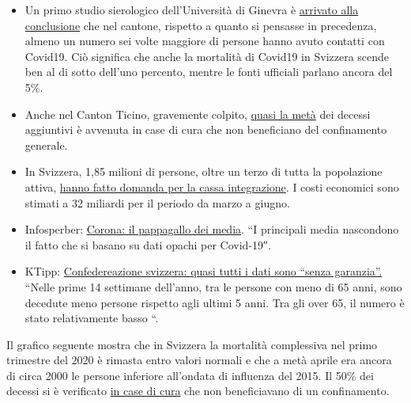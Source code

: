 \begin{itemize}
\tightlist
\item
  Un primo studio sierologico dell'Università di Ginevra è
  \href{https://www.hug-ge.ch/medias/communique-presse/seroprevalence-covid-19-premiere-estimation}{arrivato
  alla conclusione} che nel cantone, rispetto a quanto si pensasse in
  precedenza, almeno un numero sei volte maggiore di persone hanno avuto
  contatti con Covid19. Ciò significa che anche la mortalità di Covid19
  in Svizzera scende ben al di sotto dell'uno percento, mentre le fonti
  ufficiali parlano ancora del 5\%.
\item
  Anche nel Canton Ticino, gravemente colpito,
  \href{https://www.bluewin.ch/de/news/schweiz/sp-chef-levrat-will-die-reichen-schropfen-383977.html}{quasi
  la metà} dei decessi aggiuntivi è avvenuta in case di cura che non
  beneficiano del confinamento generale.
\item
  In Svizzera, 1,85 milioni di persone, oltre un terzo di tutta la
  popolazione attiva,
  \href{https://www.bluewin.ch/de/news/schweiz/sp-chef-levrat-will-die-reichen-schropfen-383977.html}{hanno
  fatto domanda per la cassa integrazione}. I costi economici sono
  stimati a 32 miliardi per il periodo da marzo a giugno.
\item
  Infosperber:
  \href{https://www.infosperber.ch/Artikel/Medien/Corona-NZZ-deckt-das-Nachplappern-anderer-Medien-auf}{Corona:
  il pappagallo dei media}. ``I principali media nascondono il fatto che
  si basano su dati opachi per Covid-19″.
\item
  KTipp:
  \href{https://www.ktipp.ch/artikel/artikeldetail/bund-fast-alle-zahlen-ohne-gewaehr/}{Confedereazione
  svizzera: quasi tutti i dati sono ``senza garanzia''.} ``Nelle prime
  14 settimane dell'anno, tra le persone con meno di 65 anni, sono
  decedute meno persone rispetto agli ultimi 5 anni. Tra gli over 65, il
  numero è stato relativamente basso ``.
\end{itemize}

Il grafico seguente mostra che in Svizzera la mortalità complessiva nel
primo trimestre del 2020 è rimasta entro valori normali e che a metà
aprile era ancora di circa 2000 le persone inferiore all'ondata di
influenza del 2015. Il 50\% dei decessi si è verificato
\href{https://www.nzz.ch/zuerich/coronavirus-zuerich-aendert-nun-das-testregime-in-heimenauch-viele-aeltere-covid-19-infizierte-entwickeln-keine-symptome-zuerich-aendert-nun-das-testregime-in-heimen-ld.1552089}{in
case di cura} che non beneficiavano di un confinamento.

